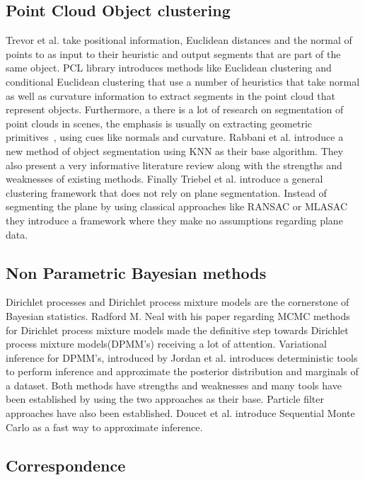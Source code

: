 \documentclass[]{article}
\begin{document}
\subsection{Point Cloud Object clustering}

Trevor et al.\cite{pointSeg} take positional information, Euclidean distances and the normal of points to as input to their heuristic and output segments that are part of the same object. PCL library\cite{pcl} introduces methods like Euclidean clustering and conditional Euclidean clustering that use a number of heuristics that take normal as well as curvature information to extract segments in the point cloud that represent objects. Furthermore, a there is a lot of research on segmentation of point clouds in scenes, the emphasis is usually on extracting geometric primitives~\cite{planarSeg},\cite{planarSeg2} using cues like normals and curvature. Rabbani et al.\cite{segOverview} introduce a new method of object segmentation using KNN as their base algorithm. They also present a very informative literature review along with the strengths and weaknesses of existing methods. Finally Triebel et al.\cite{smartSeg} introduce a general clustering framework that does not rely on plane segmentation. Instead of segmenting the plane by using classical approaches like RANSAC or MLASAC they introduce a framework where they make no assumptions regarding plane data. 

\subsection{Non Parametric Bayesian methods}

Dirichlet processes and Dirichlet process mixture models are the cornerstone of Bayesian statistics. Radford M. Neal\cite{bayes:neal} with his paper regarding MCMC methods for Dirichlet process mixture models made the definitive step towards Dirichlet process mixture models(DPMM's) receiving a lot of attention. Variational inference for DPMM's, introduced by Jordan et al.\cite{bayes:jordan} introduces deterministic tools to perform inference and approximate the posterior distribution and marginals of a dataset. Both methods have strengths and weaknesses and many tools have been established by using the two approaches as their base. Particle filter approaches have also been established. Doucet et al.\cite{bayes:smc} introduce Sequential Monte Carlo as a fast way to approximate inference.

\subsection{Correspondence}
\end{document}

